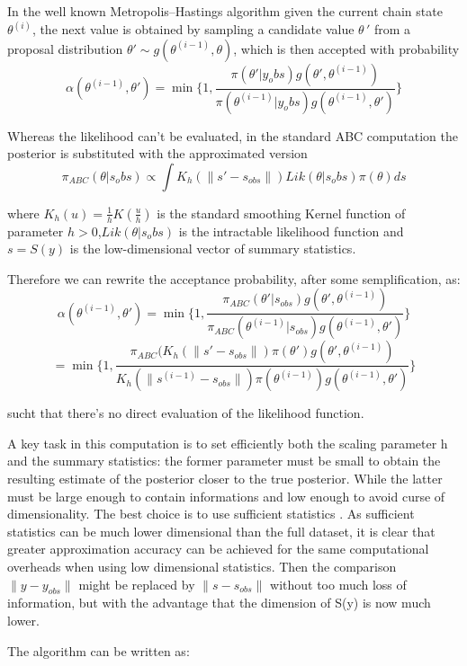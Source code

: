 \documentclass {article}
\begin{document}
In the well known Metropolis–Hastings algorithm given the current chain state $\theta^{(i)}$, the next value is obtained by sampling a candidate value $\theta \,'$ from a proposal distribution $\theta' \sim g(\theta^{(i-1)},\theta)$, which is then accepted with probability
 $$ \alpha(\theta^{(i-1)},\theta')= \min  \{ 1, \frac{\pi(\theta'|y_obs)g(\theta',\theta^{(i-1)})}{\pi(\theta^{(i-1)}|y_obs)g(\theta^{(i-1)},\theta') } \} $$


Whereas the likelihood can't be evaluated, in the standard ABC computation the posterior is substituted with the approximated version $$\pi_{ABC}(\theta|s_obs) \propto \int K_h(\parallel s'-s_{obs}\parallel)Lik(\theta|s_obs)\pi(\theta) ds $$

where ${K_h(u)}  =  \frac{1}{h}  K \left( \frac{u}{h} \right)$ is the standard smoothing Kernel function of parameter $ h>0$,$ Lik(\theta|s_obs)$ is the intractable likelihood function and $s=S(y)$ is the low-dimensional vector of summary statistics.

Therefore we can rewrite the acceptance probability, after some semplification, as:
 $$ \alpha(\theta^{(i-1)},\theta')= \min  \{ 1, \frac{\pi_{ABC}(\theta'|s_{obs})g(\theta',\theta^{(i-1)})}{\pi_{ABC}(\theta^{(i-1)}|s_{obs})g(\theta^{(i-1)},\theta') } \} $$
 $$ =\min  \{ 1, \frac{\pi_{ABC}(K_h(\parallel s'-s_{obs}\parallel)   \pi(\theta')g(\theta',\theta^{(i-1)})}{K_h(\parallel s^{(i-1)}-s_{obs}\parallel)   \pi(\theta^{(i-1)})g(\theta^{(i-1)},\theta') } \} $$

sucht that there's no direct evaluation of the likelihood function.

A key task in this computation is to set efficiently both the scaling parameter h and the summary statistics:
the former parameter must be small to obtain the resulting estimate of the posterior closer to the true posterior. While the latter must be large enough to contain informations and low enough to avoid curse of dimensionality.
The best choice is to use sufficient statistics \cite{prangle2015summary}. As sufficient statistics can be much lower dimensional than the full dataset, it is clear that greater approximation accuracy can be achieved for the same computational overheads when using low dimensional statistics.
Then the comparison $\parallel y-y_{obs} \parallel$ might be replaced by $\parallel s-s_{obs} \parallel$ without too much loss of information, but with the advantage that the dimension of S(y) is now much lower.

The algorithm \cite{fan2018abc} can be written as:
\end{document}
